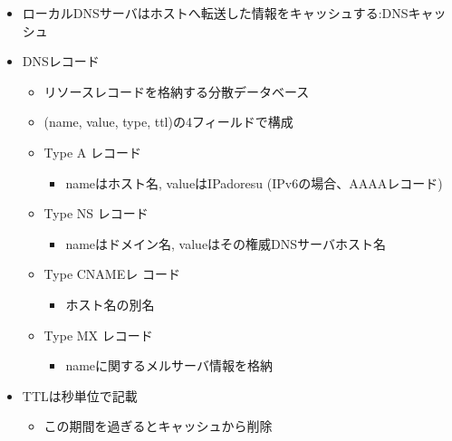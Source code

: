 \begin{itemize}
  \item ローカルDNSサーバはホストへ転送した情報をキャッシュする:DNSキャッシュ
  \item DNSレコード
  \begin{itemize}
    \item リソースレコードを格納する分散データベース
    \item (name, value, type, ttl)の4フィールドで構成
    \item Type A レコード
    \begin{itemize}
      \item nameはホスト名, valueはIPadoresu (IPv6の場合、AAAAレコード)
    \end{itemize}
    \item Type NS レコード
    \begin{itemize}
      \item nameはドメイン名, valueはその権威DNSサーバホスト名
    \end{itemize}
    \item Type CNAMEレ コード
    \begin{itemize}
      \item ホスト名の別名
    \end{itemize}
    \item Type MX レコード
    \begin{itemize}
      \item nameに関するメルサーバ情報を格納
    \end{itemize}
  \end{itemize}
  \item TTLは秒単位で記載
  \begin{itemize}
    \item この期間を過ぎるとキャッシュから削除
  \end{itemize}
\end{itemize}

